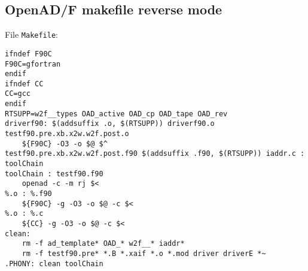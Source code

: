 \documentclass{amsart}
\theoremstyle{plain}
\numberwithin{equation}{section}
\begin{document}
\begin{appendix}
\subsection{OpenAD/F makefile reverse mode}

File \verb+Makefile+:

\begin{verbatim}
ifndef F90C
F90C=gfortran
endif
ifndef CC
CC=gcc
endif
RTSUPP=w2f__types OAD_active OAD_cp OAD_tape OAD_rev
driverf90: $(addsuffix .o, $(RTSUPP)) driverf90.o testf90.pre.xb.x2w.w2f.post.o
	${F90C} -O3 -o $@ $^
testf90.pre.xb.x2w.w2f.post.f90 $(addsuffix .f90, $(RTSUPP)) iaddr.c : toolChain
toolChain : testf90.f90
	openad -c -m rj $<
%.o : %.f90
	${F90C} -g -O3 -o $@ -c $<
%.o : %.c
	${CC} -g -O3 -o $@ -c $<
clean:
	rm -f ad_template* OAD_* w2f__* iaddr*
	rm -f testf90.pre* *.B *.xaif *.o *.mod driver driverE *~
.PHONY: clean toolChain
\end{verbatim}

\end{appendix}
\end{document}
